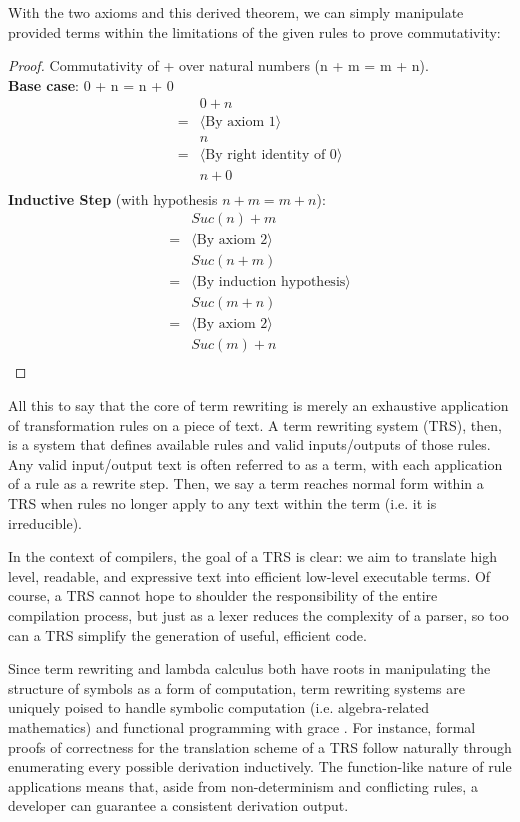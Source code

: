 \documentclass{article}
\begin{document}
With the two axioms and this derived theorem, we can simply manipulate provided terms within the limitations of the given rules to prove commutativity:
\begin{proof}
    Commutativity of + over natural numbers (n + m = m + n).
    \\
    \textbf{Base case}: 0 + n = n + 0
\begin{align*}
    &0 + n\\
    = &\langle \text{By axiom 1} \rangle \\
    &n\\
    = &\langle \text{By right identity of 0} \rangle \\
    &n + 0\\
\end{align*}
\textbf{Inductive Step} (with hypothesis $n + m = m + n$):
\begin{align*}
    &Suc(n) + m\\
    = &\langle \text{By axiom 2} \rangle \\
    &Suc(n+m)\\
    = &\langle \text{By induction hypothesis} \rangle \\
    &Suc(m+n)\\
    = &\langle \text{By axiom 2} \rangle \\
    &Suc(m)+n\\
\end{align*}
\end{proof}

All this to say that the core of term rewriting is merely an exhaustive application of transformation rules on a piece of text.
A term rewriting system (TRS), then, is a system that defines available rules and valid inputs/outputs of those rules.
Any valid input/output text is often referred to as a term, with each application of a rule as a rewrite step.
Then, we say a term reaches normal form within a TRS when rules no longer apply to any text within the term (i.e. it is irreducible).

In the context of compilers, the goal of a TRS is clear: we aim to translate high level,
readable, and expressive text into efficient low-level executable terms. Of course,
a TRS cannot hope to shoulder the responsibility of the entire compilation process,
but just as a lexer reduces the complexity of a parser, so too can a TRS simplify the generation of useful, efficient code.

Since term rewriting and lambda calculus both have roots in manipulating the structure of symbols as a form of computation,
term rewriting systems are uniquely poised to handle symbolic computation (i.e. algebra-related mathematics) and functional programming with grace \cite{baader1998term}.
For instance, formal proofs of correctness for the translation scheme of a TRS follow naturally through enumerating every possible derivation inductively.
The function-like nature of rule applications means that, aside from non-determinism and conflicting rules,
a developer can guarantee a consistent derivation output.
\end{document}
